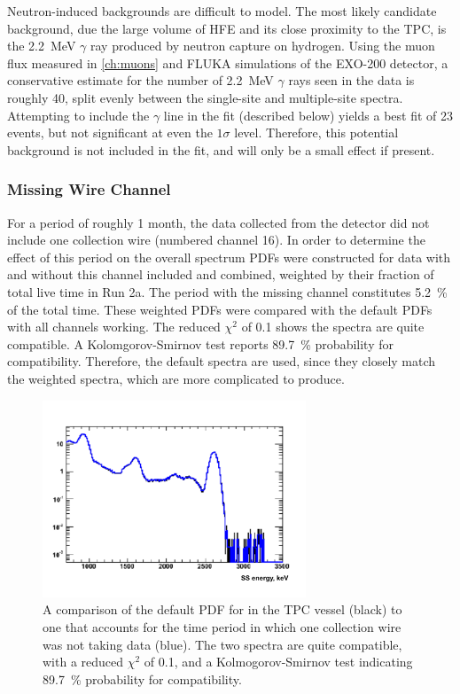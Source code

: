 \documentclass[herrin-thesis.tex]{subfiles}
\begin{document}
Neutron-induced backgrounds are difficult to model. The most likely candidate background, due the large volume of HFE and its close proximity to the TPC, is the \SI{2.2}{\MeV} \(\gamma\) ray produced by neutron capture on hydrogen. Using the muon flux measured in \cref{ch:muons} and FLUKA \cite{Ferrari:2005zk} simulations of the EXO-200 detector, a conservative estimate for the number of \SI{2.2}{\MeV} \(\gamma\) rays seen in the data is roughly 40, split evenly between the single-site and multiple-site spectra. Attempting to include the \(\gamma\) line in the fit (described below) yields a best fit of 23 events, but not significant at even the \(1\sigma\) level. Therefore, this potential background is not included in the fit, and will only be a small effect if present.

\subsubsection{Missing Wire Channel}
For a period of roughly 1 month, the data collected from the detector did not include one collection wire (numbered channel 16). In order to determine the effect of this period on the overall spectrum PDFs were constructed for data with and without this channel included and combined, weighted by their fraction of total live time in Run 2a. The period with the missing channel constitutes \SI{5.2}{\percent} of the total time. These weighted PDFs were compared with the default PDFs with all channels working. The reduced \(\chi^2\) of 0.1 shows the spectra are quite compatible. A Kolomgorov-Smirnov test reports \SI{89.7}{\percent} probability for compatibility. Therefore, the default spectra are used, since they closely match the weighted spectra, which are more complicated to produce.

\begin{figure}[htbp]
\centering
\includegraphics[width=0.7\textwidth]{./plots/analysis_missing_channel16_comparison.pdf}
\caption[Comparison of default PDF to PDF with missing channel]{A comparison of the default PDF for  in the TPC vessel (black) to one that accounts for the time period in which one collection wire was not taking data (blue). The two spectra are quite compatible, with a reduced \(\chi^2\) of 0.1, and a Kolmogorov-Smirnov test indicating \SI{89.7}{\percent} probability for compatibility.}
\label{fig:analysis_missing_channel16_comparison}
\end{figure}
\end{document}

